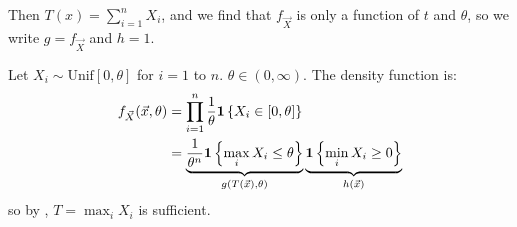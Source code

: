 \documentclass[../Main.tex]{subfiles}
\begin{document}
\begin{example}
    Then $T(x) = \sum_{i=1}^n X_i$, and we find that $f_{\vec{X}}$ is only a function of $t$ and $\theta$, so we write $g = f_{\vec{X}}$ and $h = 1$.
\end{example}
\begin{example}
    Let $X_i \sim \text{Unif}[0, \theta]$ for $i = 1$ to $n$. $\theta \in (0, \infty)$. The density function is:
    \begin{align*}
        f_{\vec{X}}(\vec{x}, \theta) &= \prod_{i=1}^{n} \frac1\theta \boldsymbol{1}\left\{X_i \in [0, \theta]\right\} \\
        &= \underbrace{\frac{1}{\theta^n} \boldsymbol{1}\left\{\max_i X_i \leq \theta\right\}}_{g(T(\vec{x}), \theta)} \underbrace{\boldsymbol{1}\left\{\min_i X_i \geq 0\right\}}_{h(\vec{x})}
    \end{align*}
    so by , $T = \max_i X_i$ is sufficient.
    \label{expUnifSuffStat}
\end{example}
\end{document}
